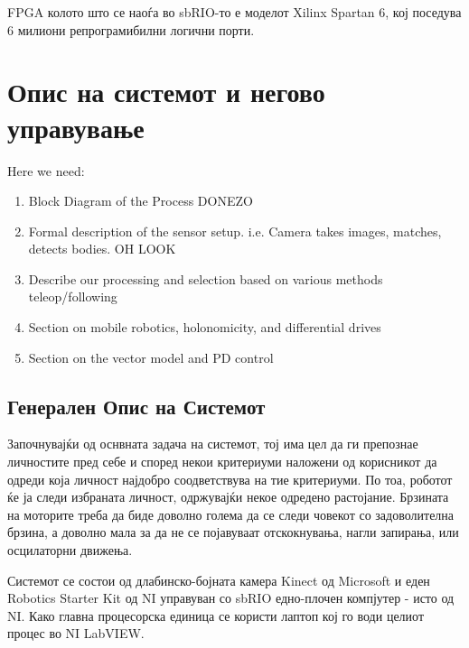 \documentclass[12pt]{article}
\begin{document}
		FPGA колото што се наоѓа во sbRIO-то е моделот Xilinx Spartan 6, кој поседува 6 милиони репрограмибилни логични порти.

\newpage

\section{Опис на системот и негово управување}
  Here we need:
  \begin{enumerate}
    \item Block Diagram of the Process DONEZO
    \item Formal description of the sensor setup. i.e. Camera takes images, matches, detects bodies. OH LOOK
    \item Describe our processing and selection based on various methods teleop/following
    \item Section on mobile robotics, holonomicity, and differential drives
    \item Section on the vector model and PD control
    \end{enumerate}

  \subsection{Генерален Опис на Системот}
    Започнувајќи од оснвната задача на системот, тој има цел да ги препознае личностите пред себе и според некои критериуми наложени од корисникот да одреди која личност најдобро соодветствува на тие критериуми. По тоа, роботот ќе ја следи избраната личност, одржувајќи некое одредено растојание. Брзината на моторите треба да биде доволно голема да се следи човекот со задоволителна брзина, а доволно мала за да не се појавуваат отскокнувања, нагли запирања, или осцилаторни движења.

    Системот се состои од длабинско-бојната камера Kinect од Microsoft и еден Robotics Starter Kit од NI управуван со sbRIO едно-плочен компјутер - исто од NI. Како главна процесорска единица се користи лаптоп кој го води целиот процес во NI LabVIEW.
\end{document}
